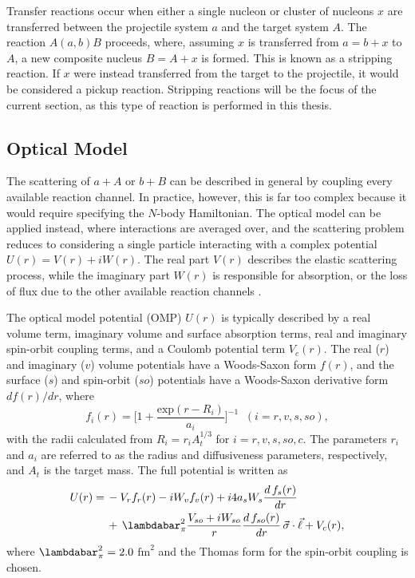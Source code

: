 Transfer reactions occur when either a single nucleon or cluster of nucleons $x$ are transferred between the projectile system $a$ and the target system $A$. The reaction $A(a,b)B$ proceeds, where, assuming $x$ is transferred from $a = b + x$ to $A$, a new composite nucleus $B = A + x$ is formed. This is known as a stripping reaction. If $x$ were instead transferred from the target to the projectile, it would be considered a pickup reaction. Stripping reactions will be the focus of the current section, as this type of reaction is performed in this thesis. 

\subsection{Optical Model} \label{subsec:Optical_Model}

The scattering of $a+A$ or $b+B$ can be described in general by coupling every available reaction channel. In practice, however, this is far too complex because it would require specifying the $N$-body Hamiltonian. The optical model can be applied instead, where interactions are averaged over, and the scattering problem reduces to considering a single particle interacting with a complex potential $U(r) = V(r) + iW(r)$. The real part $V(r)$ describes the elastic scattering process, while the imaginary part $W(r)$ is responsible for absorption, or the loss of flux due to the other available reaction channels \cite{Krane1987}. 

The optical model potential (OMP) $U(r)$ is typically described by a real volume term, imaginary volume and surface absorption terms, real and imaginary spin-orbit coupling terms, and a Coulomb potential term $V_{c}(r)$. The real ($r$) and imaginary ($v$) volume potentials have a Woods-Saxon form $f(r)$, and the surface ($s$) and spin-orbit ($so$) potentials have a Woods-Saxon derivative form $df(r)/dr$, where
\begin{equation}
f_{i}(r) = \biggl[1 + \frac{\text{exp}(r - R_{i})}{a_{i}}\biggr]^{-1} \;\; (i = r, v, s, so),
\end{equation}
with the radii calculated from $R_{i} = r_{i}A_{t}^{1/3}$ for $i = r, v, s, so, c$. The parameters $r_{i}$ and $a_{i}$ are referred to as the radius and diffusiveness parameters, respectively, and $A_{t}$ is the target mass. The full potential is written as \cite{Liang2009}
\begin{align} \label{eqn:OMP}
U(r) = \, &-V_{r}f_{r}(r) - i W_{v} f_{v}(r) + i 4 a_{s} W_{s} \frac{d \, f_{s}(r)}{d r} \nonumber \\
&+ \, \lambdabar^{2}_{\pi} \frac{V_{so} + i W_{so}}{r} \frac{d \, f_{so}(r)}{d r} \, \vec{\sigma} \cdot \vec{\ell} + V_{c}(r),
\end{align}
where $\lambdabar^{2}_{\pi} = 2.0$ $\mathrm{fm}^{2}$ and the Thomas form for the spin-orbit coupling is chosen.

